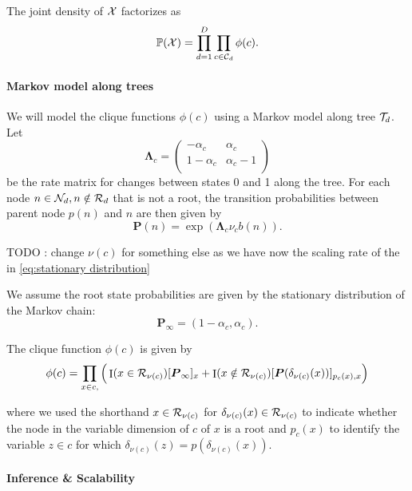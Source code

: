 \documentclass[
11pt, %
oneside, %
english, %
singlespacing, %
headsepline, %
chapterinoneline, %
]{MastersDoctoralThesis} %
\DeclareMathOperator{\Ind}{I}
\def\P{\mathbb{P}}
\def\bLambda{\boldsymbol{\Lambda}}
\def\bP{\boldsymbol{P}}
\def\C{{\cal C}}
\def\N{{\cal N}}
\def\R{{\cal R}}
\def\T{{\cal T}}
\def\X{{\cal X}}
\begin{document}
The joint density of $\X$ factorizes as
\begin{equation}
	\P(\X) = \prod_{d=1}^D \prod_{c \in \C_d} \phi(c).
\end{equation}

\paragraph{Markov model along trees} We will model the clique functions $\phi(c)$ using a Markov model along tree $\T_d$. Let
\begin{equation}
	\bLambda_c =
	\begin{pmatrix}
		-\alpha_c & \alpha_c \\
		1-\alpha_c & \alpha_c -1 \\
	\end{pmatrix}
\end{equation}
be the rate matrix for changes between states 0 and 1 along the tree. For each node $n \in \N_d, n \notin \R_d$ that is not a root, the transition probabilities between parent node $p(n)$ and $n$ are then given by
\begin{equation}
	\bP(n) = \exp(\bLambda_c \nu_c b(n)).
\end{equation}

\alert{TODO : change $\nu(c)$ for something else as we have now the scaling rate of the in \ref{eq:stationary distribution}}

We assume the root state probabilities are given by the stationary distribution of the Markov chain:
\begin{equation}
	\label{eq:stationary distribution}
	\bP_{\infty} = \left(1-\alpha_c, \alpha_c\right).
\end{equation}


The clique function $\phi(c)$ is given by
\begin{equation}
	\phi(c) = \prod_{x \in c, }\Big( \Ind(x \in \R_{\nu(c)})[\bP_{\infty}]_x\\
	+ \Ind(x \notin \R_{\nu(c)}) [\bP(\delta_{\nu(c)}(x))]_{p_{c}(x), x} \Big)
\end{equation}

where we used the shorthand $x \in \R_{\nu(c)}$ for $\delta_{\nu(c)}(x) \in \R_{\nu(c)}$ to indicate whether the node in the variable dimension of $c$ of $x$ is a root and $p_{c}(x)$ to identify the variable $z \in c$ for which $\delta_{\nu(c)}(z) = p(\delta_{\nu(c)}(x))$.


\paragraph{Inference \& Scalability}
\end{document}
